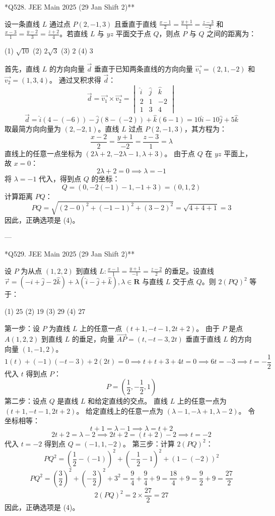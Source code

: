 \begin{questions}
\question **Q528. JEE Main 2025 (29 Jan Shift 2)**

设一条直线 $L$ 通过点 $P(2, -1, 3)$ 且垂直于直线 $\frac{x-1}{2} = \frac{y+1}{1} = \frac{z-3}{-2}$ 和 $\frac{x-3}{1} = \frac{y-2}{3} = \frac{z+2}{4}$。若直线 $L$ 与 $yz$ 平面交于点 $Q$，则点 $P$ 与 $Q$ 之间的距离为：

(1) $\sqrt{10}$ \quad (2) $2\sqrt{3}$ \quad (3) $2$ \quad (4) $3$

\begin{solution}
首先，直线 $L$ 的方向向量 $\vec{d}$ 垂直于已知两条直线的方向向量 $\vec{v_1} = (2, 1, -2)$ 和 $\vec{v_2} = (1, 3, 4)$。
通过叉积求得 $\vec{d}$：
\[
\vec{d} = \vec{v_1} \times \vec{v_2} = \begin{vmatrix} \hat{i} & \hat{j} & \hat{k} \\ 2 & 1 & -2 \\ 1 & 3 & 4 \end{vmatrix}
\]
\[
\vec{d} = \hat{i}(4 - (-6)) - \hat{j}(8 - (-2)) + \hat{k}(6 - 1) = 10\hat{i} - 10\hat{j} + 5\hat{k}
\]
取最简方向向量为 $(2, -2, 1)$。直线 $L$ 过点 $P(2, -1, 3)$，其方程为：
\[
\frac{x-2}{2} = \frac{y+1}{-2} = \frac{z-3}{1} = \lambda
\]
直线上的任意一点坐标为 $(2\lambda + 2, -2\lambda - 1, \lambda + 3)$。
由于点 $Q$ 在 $yz$ 平面上，故 $x = 0$：
\[
2\lambda + 2 = 0 \implies \lambda = -1
\]
将 $\lambda = -1$ 代入，得到点 $Q$ 的坐标：
\[
Q = (0, -2(-1)-1, -1+3) = (0, 1, 2)
\]
计算距离 $PQ$：
\[
PQ = \sqrt{(2-0)^2 + (-1-1)^2 + (3-2)^2} = \sqrt{4 + 4 + 1} = 3
\]
因此，正确选项是 (4)。
\end{solution}

---

\question **Q529. JEE Main 2025 (29 Jan Shift 2)**

设 $P$ 为从点 $(1, 2, 2)$ 到直线 $L : \frac{x-1}{1} = \frac{y+1}{-1} = \frac{z-2}{2}$ 的垂足。设直线 $\vec{r} = (-\hat{i} + \hat{j} - 2\hat{k}) + \lambda(\hat{i} - \hat{j} + \hat{k}), \lambda \in \mathbf{R}$ 与直线 $L$ 交于点 $Q$。则 $2(PQ)^2$ 等于：

(1) $25$ \quad (2) $19$ \quad (3) $29$ \quad (4) $27$

\begin{solution}
第一步：设 $P$ 为直线 $L$ 上的任意一点 $(t+1, -t-1, 2t+2)$。
由于 $P$ 是点 $A(1, 2, 2)$ 到直线 $L$ 的垂足，向量 $\vec{AP} = (t, -t-3, 2t)$ 垂直于直线 $L$ 的方向向量 $(1, -1, 2)$。
\[
1(t) + (-1)(-t-3) + 2(2t) = 0 \implies t + t + 3 + 4t = 0 \implies 6t = -3 \implies t = -\frac{1}{2}
\]
代入 $t$ 得到点 $P$：
\[
P = (\frac{1}{2}, -\frac{1}{2}, 1)
\]
第二步：设点 $Q$ 是直线 $L$ 和给定直线的交点。
直线 $L$ 上的任意一点为 $(t+1, -t-1, 2t+2)$。
给定直线上的任意一点为 $(\lambda-1, -\lambda+1, \lambda-2)$。
令坐标相等：
\[
t+1 = \lambda-1 \implies \lambda = t+2
\]
\[
2t+2 = \lambda-2 \implies 2t+2 = (t+2)-2 \implies t = -2
\]
代入 $t = -2$ 得到点 $Q = (-1, 1, -2)$。
第三步：计算 $2(PQ)^2$：
\[
PQ^2 = (\frac{1}{2} - (-1))^2 + (-\frac{1}{2} - 1)^2 + (1 - (-2))^2
\]
\[
PQ^2 = (\frac{3}{2})^2 + (-\frac{3}{2})^2 + 3^2 = \frac{9}{4} + \frac{9}{4} + 9 = \frac{18}{4} + 9 = \frac{9}{2} + 9 = \frac{27}{2}
\]
\[
2(PQ)^2 = 2 \times \frac{27}{2} = 27
\]
因此，正确选项是 (4)。
\end{solution}


\end{questions}
